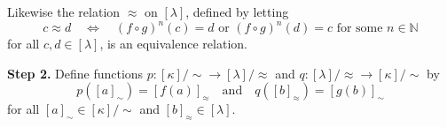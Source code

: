 \begin{cproof}

Likewise the relation $\approx$ on $[\lambda]$, defined by letting
\[ c \approx d \quad \Leftrightarrow \quad (f \circ g)^n(c) = d \text{ or } (f \circ g)^n(d) = c \text{ for some } n \in \mathbb{N} \]
for all $c,d \in [\lambda]$, is an equivalence relation.

\textbf{Step 2.} Define functions $p : [\kappa]/{\sim} \to [\lambda]/{\approx}$ and $q : [\lambda]/{\approx} \to [\kappa]/{\sim}$ by
\[ p([a]_{\sim}) = [f(a)]_{\approx} \quad \text{and} \quad q([b]_{\approx}) = [g(b)]_{\sim} \]
for all $[a]_{\sim} \in [\kappa]/{\sim}$ and $[b]_{\approx} \in [\lambda]$.


\end{cproof}
